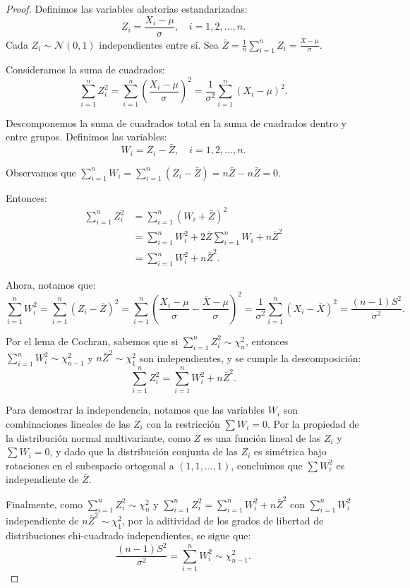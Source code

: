 \documentclass[11pt,a4paper]{article}
\theoremstyle{plain}
\theoremstyle{definition}
\begin{document}
\begin{proof}
Definimos las variables aleatorias estandarizadas:
\[
Z_i = \frac{X_i - \mu}{\sigma}, \quad i = 1, 2, \ldots, n.
\]
Cada $Z_i \sim \mathcal{N}(0,1)$ independientes entre sí. Sea $\bar{Z} = \frac{1}{n}\sum_{i=1}^{n}Z_i = \frac{\bar{X} - \mu}{\sigma}$.

Consideramos la suma de cuadrados:
\[
\sum_{i=1}^{n} Z_i^2 = \sum_{i=1}^{n} \left(\frac{X_i - \mu}{\sigma}\right)^2 = \frac{1}{\sigma^2}\sum_{i=1}^{n}(X_i - \mu)^2.
\]

Descomponemos la suma de cuadrados total en la suma de cuadrados dentro y entre grupos. Definimos las variables:
\[
W_i = Z_i - \bar{Z}, \quad i = 1, 2, \ldots, n.
\]

Observamos que $\sum_{i=1}^{n} W_i = \sum_{i=1}^{n}(Z_i - \bar{Z}) = n\bar{Z} - n\bar{Z} = 0$.

Entonces:
\begin{align*}
\sum_{i=1}^{n} Z_i^2 &= \sum_{i=1}^{n}(W_i + \bar{Z})^2 \\
&= \sum_{i=1}^{n} W_i^2 + 2\bar{Z}\sum_{i=1}^{n} W_i + n\bar{Z}^2 \\
&= \sum_{i=1}^{n} W_i^2 + n\bar{Z}^2.
\end{align*}

Ahora, notamos que:
\[
\sum_{i=1}^{n} W_i^2 = \sum_{i=1}^{n}(Z_i - \bar{Z})^2 = \sum_{i=1}^{n}\left(\frac{X_i - \mu}{\sigma} - \frac{\bar{X} - \mu}{\sigma}\right)^2 = \frac{1}{\sigma^2}\sum_{i=1}^{n}(X_i - \bar{X})^2 = \frac{(n-1)S^2}{\sigma^2}.
\]

Por el lema de Cochran, sabemos que si $\sum_{i=1}^{n} Z_i^2 \sim \chi^2_n$, entonces $\sum_{i=1}^{n} W_i^2 \sim \chi^2_{n-1}$ y $n\bar{Z}^2 \sim \chi^2_1$ son independientes, y se cumple la descomposición:
\[
\sum_{i=1}^{n} Z_i^2 = \sum_{i=1}^{n} W_i^2 + n\bar{Z}^2.
\]

Para demostrar la independencia, notamos que las variables $W_i$ son combinaciones lineales de las $Z_i$ con la restricción $\sum W_i = 0$. Por la propiedad de la distribución normal multivariante, como $\bar{Z}$ es una función lineal de las $Z_i$ y $\sum W_i = 0$, y dado que la distribución conjunta de las $Z_i$ es simétrica bajo rotaciones en el subespacio ortogonal a $(1,1,\ldots,1)$, concluimos que $\sum W_i^2$ es independiente de $\bar{Z}$.

Finalmente, como $\sum_{i=1}^{n} Z_i^2 \sim \chi^2_n$ y $\sum_{i=1}^{n} Z_i^2 = \sum_{i=1}^{n} W_i^2 + n\bar{Z}^2$ con $\sum_{i=1}^{n} W_i^2$ independiente de $n\bar{Z}^2 \sim \chi^2_1$, por la aditividad de los grados de libertad de distribuciones chi-cuadrado independientes, se sigue que:
\[
\frac{(n-1)S^2}{\sigma^2} = \sum_{i=1}^{n} W_i^2 \sim \chi^2_{n-1}.
\]
\end{proof}
\end{document}
